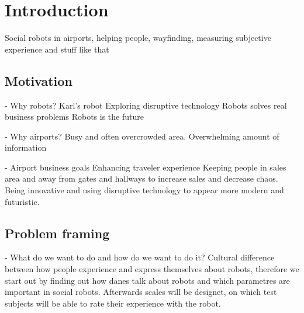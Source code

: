 \section{Introduction}
\label{Introduction}
Social robots in airports, helping people, wayfinding, measuring subjective experience and stuff like that

\subsection{Motivation}
- Why robots?
Karl’s robot
Exploring disruptive technology
Robots solves real business problems
Robots is the future

- Why airports?
Busy and often overcrowded area. Overwhelming amount of information

- Airport business goals
Enhancing traveler experience
Keeping people in sales area and away from gates and hallways to increase sales and decrease chaos.
Being innovative and using disruptive technology to appear more modern and futuristic.

\subsection{Problem framing}
- What do we want to do and how do we want to do it?
Cultural difference between how people experience and express themselves about robots, therefore we start out by finding out how danes talk about robots and which parametres are important in social robots. Afterwards scales will be designet, on which test subjects will be able to rate their experience with the robot. 